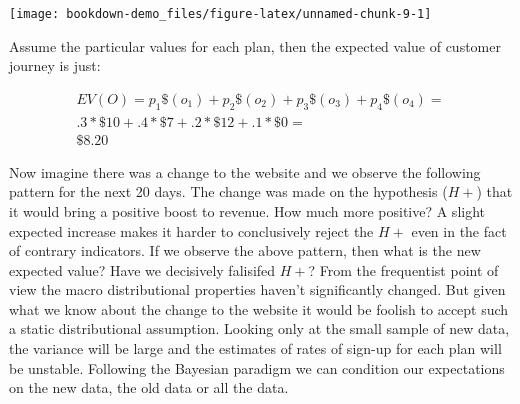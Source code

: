 \documentclass[]{tufte-book}
\theoremstyle{definition}
\theoremstyle{definition}
\theoremstyle{definition}
\theoremstyle{remark}
\begin{document}
\texttt{[image: bookdown-demo\_files/figure-latex/unnamed-chunk-9-1]}

Assume the particular values for each plan, then the expected value of customer journey is just:

\begin{equation}
\begin{split}
EV(O) =  p_{1}\$(o_{1}) + p_{2}\$(o_{2}) + p_{3}\$(o_{3}) + p_{4}\$(o_{4})  = \\ .3*\$10 + .4*\$7 + .2*\$12 + .1*\$0  = \\ \$8.20 
\end{split}
\end{equation}

Now imagine there was a change to the website and we observe the following pattern for the next 20 days. The change was made on the hypothesis (\(H+\)) that it would bring a positive boost to revenue. How much more positive? A slight expected increase makes it harder to conclusively reject the \(H+\) even in the fact of contrary indicators. If we observe the above pattern, then what is the new expected value? Have we decisively falisifed \(H+\)? From the frequentist point of view the macro distributional properties haven't significantly changed. But given what we know about the change to the website it would be foolish to accept such a static distributional assumption. Looking only at the small sample of new data, the variance will be large and the estimates of rates of sign-up for each plan will be unstable. Following the Bayesian paradigm we can condition our expectations on the new data, the old data or all the data.
\end{document}
